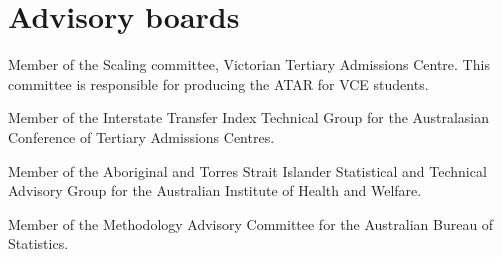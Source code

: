 \documentclass[a4paper,10pt]{article}
\begin{document}
\section{Advisory boards}

\begin{compactitem}
\item Member of the Scaling committee, Victorian Tertiary Admissions Centre. This committee is responsible for producing the ATAR for VCE students.
\item Member of the Interstate Transfer Index Technical Group for the Australasian Conference of Tertiary Admissions Centres.
\item Member of the Aboriginal and Torres Strait Islander Statistical and Technical Advisory Group for the Australian Institute of Health and Welfare.
\item Member of the Methodology Advisory Committee for the Australian Bureau of Statistics.
\end{compactitem}

\enlargethispage*{0.6cm}

\setlength{\bibitemsep}{1.8pt}

\end{document}
